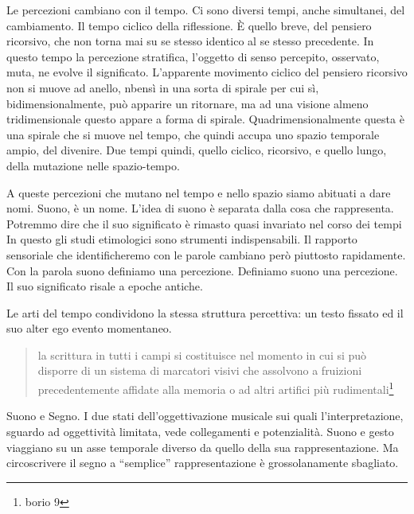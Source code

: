 \begin{multicols}{2}

Le percezioni cambiano con il tempo. Ci sono diversi tempi, anche simultanei, del cambiamento.
Il tempo ciclico della riflessione. È quello breve, del pensiero ricorsivo, che non torna mai su se stesso identico al se stesso precedente.
In questo tempo la percezione stratifica, l'oggetto di senso percepito, osservato, muta, ne evolve il significato.
L'apparente movimento ciclico del pensiero ricorsivo non si muove ad anello, nbensì in una sorta di spirale per cui sì, bidimensionalmente, può apparire un ritornare, ma ad una visione almeno tridimensionale questo appare a forma di spirale.
Quadrimensionalmente questa è una spirale che si muove nel tempo, che quindi accupa uno spazio temporale ampio, del divenire. Due tempi quindi, quello ciclico, ricorsivo, e quello lungo, della mutazione nelle spazio-tempo.


A queste percezioni che mutano nel tempo e nello spazio siamo abituati a dare nomi. Suono, è un nome.
L'idea di suono è separata dalla cosa che rappresenta.
Potremmo dire che il suo significato è rimasto quasi invariato nel corso dei tempi
In questo gli studi etimologici sono strumenti indispensabili.
Il rapporto sensoriale che identificheremo con le parole cambiano però piuttosto rapidamente.
Con la parola suono definiamo una percezione. Definiamo suono una percezione.
Il suo significato risale a epoche antiche.

Le arti del tempo condividono la stessa struttura percettiva: un testo fissato ed il suo alter ego evento momentaneo.

\begin{quote}
	la scrittura in tutti i campi si costituisce nel momento in cui si può disporre di un sistema di marcatori visivi che assolvono a fruizioni precedentemente affidate alla memoria o ad altri artifici più rudimentali\footnote{borio 9}
\end{quote}

Suono e Segno. I due stati dell'oggettivazione musicale sui quali l'interpretazione, sguardo ad oggettività limitata, vede collegamenti e potenzialità. Suono e gesto viaggiano su un asse temporale diverso da quello della sua rappresentazione. Ma circoscrivere il segno a “semplice” rappresentazione è grossolanamente sbagliato.


\end{multicols}
